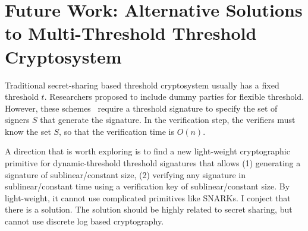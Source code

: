 \section{Future Work: Alternative Solutions to Multi-Threshold Threshold Cryptosystem}

Traditional secret-sharing based threshold cryptosystem usually has a fixed threshold $t$. Researchers proposed to include dummy parties for flexible threshold. However, these schemes~\cite{DBLP:conf/crypto/DelerableeP08} require a threshold signature to specify the set of signers $S$ that generate the signature. In the verification step, the verifiers must know the set $S$, so that the verification time is $O(n)$. 

A direction that is worth exploring is to find a new light-weight cryptographic primitive for dynamic-threshold threshold signatures that allows (1) generating a signature of sublinear/constant size, (2) verifying any signature in sublinear/constant time using a verification key of sublinear/constant size. By light-weight, it cannot use complicated primitives like SNARKs. I conject that there is a solution. The solution should be highly related to secret sharing, but cannot use discrete log based cryptography.  
